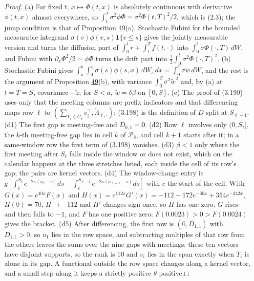 \documentclass[11pt]{article}
\providecommand{\square}{\mdlgwhtsquare}
\begin{document}
\emph{Proof.} (a) For fixed \(t\), \(x\mapsto\Phi(t,x)\) is absolutely continuous with derivative \(\phi(t,x)\) almost everywhere, so \(\int_t^T\sigma^2\phi\Phi=\sigma^2\Phi(t,T)^2/2\), which is (2.3); the jump condition is that of Proposition \hyperref[res:Proposition-49]{49}(a). Stochastic Fubini for the bounded measurable integrand \(\sigma(v)\phi(v,s)\mathbf 1\{v\le s\}\) gives the jointly measurable version and turns the diffusion part of \(\int_0^tr+\int_t^Tf(t,\cdot)\) into \(\int_0^t\sigma\Phi(\cdot,T)\,dW\), and Fubini with \(\partial_x\Phi^2/2=\phi\Phi\) turns the drift part into \(\tfrac12\int_0^t\sigma^2\Phi(\cdot,T)^2\). (b) Stochastic Fubini gives \(\int_a^b\int_0^x\sigma(s)\phi(s,x)\,dW_s\,dx=\int_0^b\sigma\tilde w\,dW\), and the rest is the argument of Proposition \hyperref[res:Proposition-49]{49}(b), with variance \(\int_0^S\sigma^2\tilde w^2\) and, by (a) at \(t=T=S\), covariance \(-\tilde z\); for \(S<a\), \(\tilde w=\delta\beta\) on \([0,S]\). (c) The proof of (3.190) uses only that the meeting columns are prefix indicators and that differencing maps row \(\ell\) to \((\sum_{T_i\in G_\ell}e_i^\top,\tilde\Lambda_{\ell,\cdot})\); (3.198) is the definition of \(D\) split at \(S_{\ell-1}\). (d1) The first gap is meeting-free and \(D_{0,1}=0\). (d2) Row \(\ell\) involves only \((0,S_\ell]\), the \(k\)-th meeting-free gap lies in cell \(k\) of \(\mathcal P_8\), and cell \(k+1\) starts after it; in a same-window row the first term of (3.198) vanishes. (d3) \(\beta<1\) only where the first meeting after \(S_\ell\) falls inside the window or does not exist, which on the calendar happens at the three stretches listed, each inside the cell of its row's gap; the pairs are kernel vectors. (d4) The window-change entry is \(g[\int_c^{S_\ell}e^{-2\kappa(a_\ell-s)}ds-\int_c^{S_{\ell-1}}e^{-2\kappa(a_{\ell-1}-s)}ds]\) with \(c\) the start of the cell. With \(G(x)=e^{10x}F(x)\) and \(H(x)=e^{112x}G'(x)=-112-172e^{-60x}+354e^{-242x}\), \(H(0)=70\), \(H\to-112\) and \(H'\) changes sign once, so \(H\) has one zero, \(G\) rises and then falls to \(-1\), and \(F\) has one positive zero; \(F(0.0023)>0>F(0.0024)\) gives the bracket. (d5) After differencing, the first row is \((0,D_{1,1})\) with \(D_{1,1}>0\), so \(u_1\) lies in the row space, and subtracting multiples of that row from the others leaves the sums over the nine gaps with meetings; these ten vectors have disjoint supports, so the rank is 10 and \(v_i\) lies in the span exactly when \(T_i\) is alone in its gap. A functional outside the row space changes along a kernel vector, and a small step along it keeps a strictly positive \(\theta\) positive.\hfill$\square$
\end{document}
